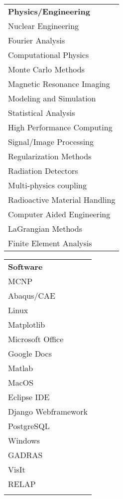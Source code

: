 \\[2mm]
\begin{minipage}{0.32\textwidth}
\begin{tabular}{l}
	{\large\textbf{Physics/Engineering}} \\
	\highskillbw Nuclear Engineering \\
	\highskillbw Fourier Analysis \\ 
	\highskillbw Computational Physics \\
	\highskillbw Monte Carlo Methods \\
	\highskillbw Magnetic Resonance Imaging \\ 
	\highskillbw Modeling and Simulation \\
	\medskillbw Statistical Analysis \\
	\medskillbw High Performance Computing \\
	\medskillbw Signal/Image Processing \\
	\medskillbw Regularization Methods  \\
	\medskillbw Radiation Detectors \\
	\medskillbw Multi-physics coupling \\
	\medskillbw Radioactive Material Handling \\
	\lowskillbw Computer Aided Engineering \\
	\lowskillbw LaGrangian Methods \\
	\lowskillbw Finite Element Analysis \\
\end{tabular}
\end{minipage}%
\begin{minipage}{0.2\textwidth}
	\begin{center}
\begin{tabular}{l}
	{\large\textbf{Software}} \\
	\highskillbw \textsc{MCNP} \\
	\highskillbw Abaqus/CAE \\
	\highskillbw Linux \\ 
	\highskillbw Matplotlib \\ 
	\highskillbw Microsoft Office \\
	\highskillbw Google Docs \\
	\highskillbw Matlab \\
	\highskillbw MacOS \\
	\medskillbw Eclipse IDE \\
	\medskillbw Django Webframework \\
	\medskillbw PostgreSQL \\
	\medskillbw Windows \\
	\lowskillbw GADRAS \\
	\lowskillbw VisIt \\
	\lowskillbw RELAP \\
	\\
\end{tabular}
	\end{center}
\end{minipage}%

